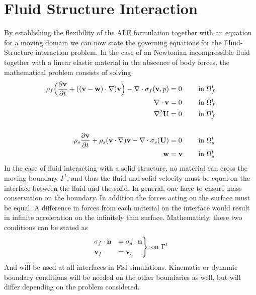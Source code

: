 \section{Fluid Structure Interaction}
By establishing the flexibility of the ALE formulation together with an equation for a moving domain we can now state the governing equations for the Fluid-Structure interaction problem. In the case of an Newtonian incompressible fluid together with a linear elastic material in the abscence of body forces, the mathematical problem consists of solving
\begin{alignat}{3}
\rho_f \Big{(} \frac{\partial \mathbf{v}}{\partial t} + ((\mathbf{v}-\mathbf{w})  \cdot \nabla )  \mathbf{v} \Big{)} - \nabla \cdot \sigma_f(\mathbf{v},p)& = 0 \quad && \text{ in } \Omega_f^t \\
\nabla \cdot \mathbf{v} & = 0 && \text{ in } \Omega_f^t\\
\nabla ^2 \mathbf{U} & = 0 && \text{ in } \Omega_f^t
\\
\\
\rho_s \frac{\partial \mathbf{v}}{\partial t} + \rho_s(\mathbf{v}\cdot\nabla)\mathbf{v} -\nabla \cdot \sigma_s(\mathbf{U}) & = 0  &&\text{ in } \Omega_s^t \\
\mathbf{w} & =  \mathbf{v} && \text{ in } \Omega_s^t
\end{alignat}
In the case of fluid interacting with a solid structure, no material can cross the moving boundary $\Gamma^t$, and thus the fluid and solid velocity must be equal on the interface between the fluid and the solid. In general, one have to ensure mass conservation on the boundary. In addition the forces acting on the surface must be equal. A difference in forces from each material on the interface would result in infinite acceleration on the infinitely thin surface. Mathematicly, these two conditions can be stated as
\begin{align}
\begin{rcases}
\sigma_f \cdot \mathbf{n} & =  \sigma_s \cdot \mathbf{n} \\
\mathbf{v}_f & = \mathbf{v}_s
\end{rcases}
\text{ on } \Gamma^t
\end{align}
And will be used at all interfaces in FSI simulations. Kinematic or dynamic boundary conditions will be needed on the other boundaries as well, but will differ depending on the problem considered. 
\\

